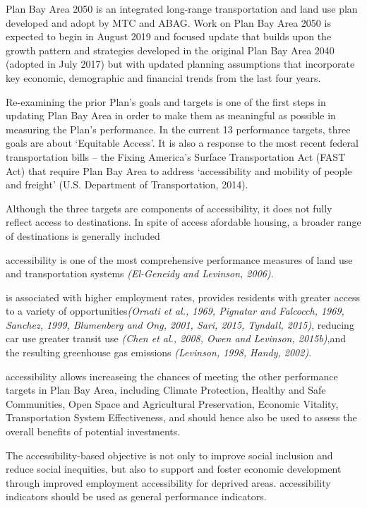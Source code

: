 \documentclass[12pt,]{article}
\begin{document}
Plan Bay Area 2050 is an integrated long-range transportation and land
use plan developed and adopt by MTC and ABAG. Work on Plan Bay Area 2050
is expected to begin in August 2019 and focused update that builds upon
the growth pattern and strategies developed in the original Plan Bay
Area 2040 (adopted in July 2017) but with updated planning assumptions
that incorporate key economic, demographic and financial trends from the
last four years.

Re-examining the prior Plan's goals and targets is one of the first
steps in updating Plan Bay Area in order to make them as meaningful as
possible in measuring the Plan's performance. In the current 13
performance targets, three goals are about `Equitable Access'. It is
also a response to the most recent federal transportation bills -- the
Fixing America's Surface Transportation Act (FAST Act) that require Plan
Bay Area to address `accessibility and mobility of people and freight'
(U.S. Department of Transportation, 2014).

Although the three targets are components of accessibility, it does not
fully reflect access to destinations. In spite of access afordable
housing, a broader range of destinations is generally included

accessibility is one of the most comprehensive performance measures of
land use and transportation systems \emph{(El-Geneidy and Levinson,
2006)}.

is associated with higher employment rates, provides residents with
greater access to a variety of opportunities\emph{(Ornati et al., 1969,
Pignatar and Falcocch, 1969, Sanchez, 1999, Blumenberg and Ong, 2001,
Sari, 2015, Tyndall, 2015)}, reducing car use greater transit use
\emph{(Chen et al., 2008, Owen and Levinson, 2015b)},and the resulting
greenhouse gas emissions \emph{(Levinson, 1998, Handy, 2002)}.

accessibility allows increaseing the chances of meeting the other
performance targets in Plan Bay Area, including Climate Protection,
Healthy and Safe Communities, Open Space and Agricultural Preservation,
Economic Vitality, Transportation System Effectiveness, and should hence
also be used to assess the overall benefits of potential investments.

The accessibility-based objective is not only to improve social
inclusion and reduce social inequities, but also to support and foster
economic development through improved employment accessibility for
deprived areas. accessibility indicators should be used as general
performance indicators.
\end{document}
